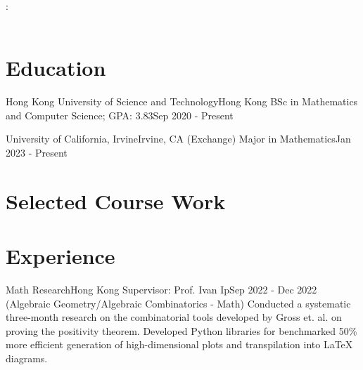 \documentclass[letterpaper, 11pt]{article}
\begin{document}
\noindent\begin{minipage}{0.7\textwidth}
    \textbf{\href{https://github.com/darinchau}{\Large{\myname}}} \\ 
    \email \hspace{3pt} \myemail \\
    \github \hspace{3pt} \mygithub \\
    \phone : \mymobile \\
    \linkedin \hspace{3pt} \mylinkedin \\
\end{minipage}
\hfill%


\section{Education}
    \resumeSubHeadingListStart
        \resumeSubheading
            {Hong Kong University of Science and Technology}{Hong Kong}
            {BSc in Mathematics and Computer Science;    GPA: 3.83}{Sep 2020 - Present}

        \resumeSubheading
            {University of California, Irvine}{Irvine, CA}
            {(Exchange) Major in Mathematics}{Jan 2023 - Present}
    \resumeSubHeadingListEnd

\section{Selected Course Work}
\resumeSubHeadingListStart
\resumeSubHeadingListEnd

\section{Experience}
    \resumeSubHeadingListStart
        \resumeSubheading
            {Math Research}{Hong Kong}
            {Supervisor: Prof. Ivan Ip}{Sep 2022 - Dec 2022}
            \resumeItemListStart
                    {(Algebraic Geometry/Algebraic Combinatorics - Math) Conducted a systematic three-month research on the combinatorial tools developed by Gross et. al. on proving the positivity theorem.}
                    {Developed Python libraries for benchmarked 50\% more efficient generation of high-dimensional plots and transpilation into LaTeX diagrams.}
            \resumeItemListEnd
\end{document}
